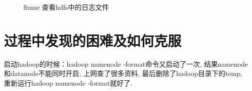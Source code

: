 \documentclass{article}
\begin{document}
\begin{enumerate}
\begin{figure}[htp]
        \caption{flume 查看hdfs中的日志文件}
        \label{pic8}
    \end{figure}
    

\end{enumerate}
\newpage
\section{过程中发现的困难及如何克服}
启动hadoop的时候：hadoop namenode -format命令又启动了一次,
结果namenode和datanode不能同时开启, 
上网查了很多资料, 最后删除了hadoop目录下的temp,
重新运行hadoop namenode -format就好了.
\end{document}
